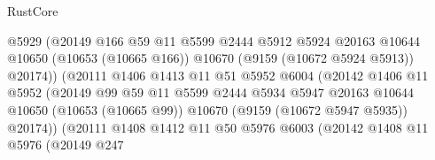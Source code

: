 \begin{lexlean}{RustCore}
\begin{coremodule}
                                      @5929
                                      (@20149
                                        @166
                                        @59
                                        @11
                                        @5599
                                        @2444
                                        @5912
                                        @5924
                                        @20163
                                        @10644
                                        @10650
                                        (@10653 (@10665 @166))
                                        @10670
                                        (@9159 (@10672 @5924 @5913))
                                        @20174))
                                    (@20111
                                      @1406
                                      @1413
                                      @11
                                      @51
                                      @5952
                                      @6004
                                      (@20142
                                        @1406
                                        @11
                                        @5952
                                        (@20149
                                          @99
                                          @59
                                          @11
                                          @5599
                                          @2444
                                          @5934
                                          @5947
                                          @20163
                                          @10644
                                          @10650
                                          (@10653 (@10665 @99))
                                          @10670
                                          (@9159 (@10672 @5947 @5935))
                                          @20174))
                                      (@20111
                                        @1408
                                        @1412
                                        @11
                                        @50
                                        @5976
                                        @6003
                                        (@20142
                                          @1408
                                          @11
                                          @5976
                                          (@20149
                                            @247

\end{coremodule}
\end{lexlean}
